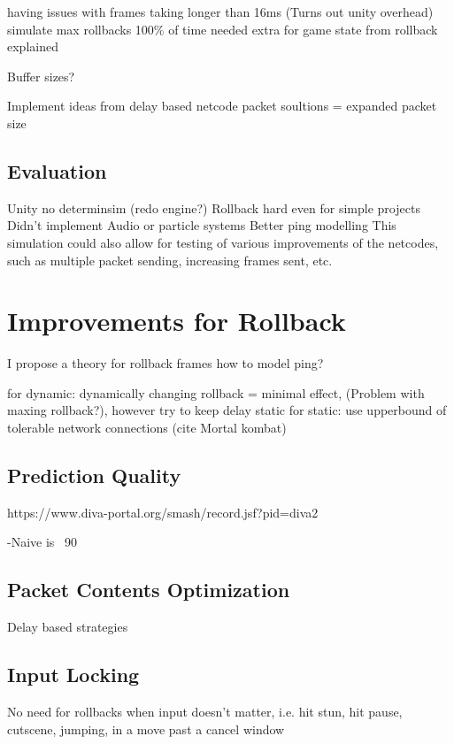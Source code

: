 \documentclass{entcs}
\begin{document}
having issues with frames taking longer than 16ms (Turns out unity overhead)
simulate max rollbacks 100\% of time
needed extra for game state from rollback explained

Buffer sizes?

Implement ideas from delay based netcode packet soultions = expanded packet size

\subsection{Evaluation}
Unity no determinsim (redo engine?)
Rollback hard even for simple projects
Didn't implement Audio or particle systems
Better ping modelling
This simulation could also allow for testing of various improvements of the netcodes, such as multiple packet sending, increasing frames sent, etc.

\section{Improvements for Rollback}

I propose a theory for rollback frames 
how to model ping?
%


for dynamic: dynamically changing rollback = minimal effect, (Problem with maxing rollback?), however try to keep delay static
for static: use upperbound of tolerable network connections (cite Mortal kombat)

\subsection{Prediction Quality}
https://www.diva-portal.org/smash/record.jsf?pid=diva2%

-Naive is ~90%
\subsection{Packet Contents Optimization}
Delay based strategies

\subsection{Input Locking}
No need for rollbacks when input doesn't matter, i.e. hit stun, hit pause, cutscene, jumping, in a move past a cancel window
\end{document}
